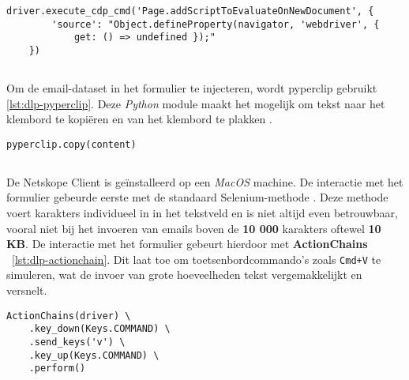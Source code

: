 \begin{lstlisting}[style=custompython,label={lst:dlp-stealth},caption={Best practice voor browserautomatisering}, captionpos=b]
    driver.execute_cdp_cmd('Page.addScriptToEvaluateOnNewDocument', {
        'source': "Object.defineProperty(navigator, 'webdriver', {
            get: () => undefined });"
    })
\end{lstlisting}

\subsection{}
\label{subsubsec:clipboard}

Om de email-dataset in het formulier te injecteren, wordt pyperclip gebruikt \ref{lst:dlp-pyperclip}.
Deze \textit{Python} module maakt het mogelijk om tekst naar het klembord te kopiëren en van het klembord te plakken \autocite{Pyperclip2025}.

\begin{lstlisting}[style=custompython, label={lst:dlp-pyperclip}, caption={Clipboardmanipulatie met Pyperclip}, captionpos=b]
    pyperclip.copy(content)
\end{lstlisting}

\subsection{}
\label{subsubsec:gebruikersinteractie}

De Netskope Client is geïnstalleerd op een \textit{MacOS} machine. De interactie met het formulier gebeurde eerste met de standaard Selenium-methode \texttt{}. 
Deze methode voert karakters individueel in in het tekstveld en is niet altijd even betrouwbaar, vooral niet bij het invoeren van emails boven de \textbf{10 000} karakters oftewel \textbf{10 KB}.
De interactie met het formulier gebeurt hierdoor met \textbf{ActionChains} \autocite{Selenium2025ActionChains}~\ref{lst:dlp-actionchain}. 
Dit laat toe om toetsenbordcommando's zoals \texttt{Cmd+V} te simuleren, wat de invoer van grote hoeveelheden tekst vergemakkelijkt en versnelt.

\begin{lstlisting}[style=custompython,label={lst:dlp-actionchain},caption={gebruikersinteractie via ActionChains}, captionpos=b]
    ActionChains(driver) \
    .key_down(Keys.COMMAND) \
    .send_keys('v') \
    .key_up(Keys.COMMAND) \
    .perform()
\end{lstlisting}

